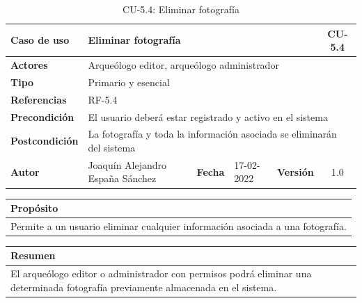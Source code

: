     \begin{table}[H]
    \begin{center}
        \begin{adjustbox}{width=\textwidth}
        \begin{tabular}{ | l | l | l | l | c | c | } 
            \hline
            \textbf{Caso de uso} & \multicolumn{4}{l|}{Eliminar fotografía} & \cellcolor{gray!50} \textbf{CU-5.4}\\
            \hline
            \textbf{Actores} & \multicolumn{5}{p{0.9\linewidth}|}{Arqueólogo editor, arqueólogo administrador} \\
            \hline
            \textbf{Tipo} & \multicolumn{5}{l|}{Primario y esencial} \\
            \hline
            \textbf{Referencias} & \multicolumn{3}{l|}{RF-5.4} & \multicolumn{2}{l|}{ }\\
            \hline
            \textbf{Precondición} & \multicolumn{5}{l|}{El usuario deberá estar registrado y activo en el sistema} \\
            \hline
            \textbf{Postcondición} & \multicolumn{5}{l|}{La fotografía y toda la información asociada se eliminarán del sistema} \\
            \hline
            \textbf{Autor} & \multicolumn{1}{p{0.25\linewidth}|}{Joaquín Alejandro España Sánchez} & \textbf{Fecha} & 
            17-02-2022     & \textbf{Versión}                                                      & 1.0\\
            \hline
        \end{tabular}
        \end{adjustbox}
        \caption{CU-5.4: Eliminar fotografía}
        \label{tab:delete-photo}
    \end{center}
    \end{table}

    \begin{table}[H]
        \centering
        \begin{tabularx}{\textwidth}{@{} |L |@{}} \hline
            \textbf{Propósito} \\
            \hline
            Permite a un usuario eliminar cualquier información asociada a una fotografía. \\
            \hline
        \end{tabularx}
    \end{table}

    \begin{table}[H]
        \centering
        \begin{tabularx}{\textwidth}{@{} |L |@{}} \hline
            \textbf{Resumen} \\
            \hline
            El arqueólogo editor o administrador con permisos podrá eliminar una determinada
            fotografía previamente almacenada en el sistema. \\
            \hline
        \end{tabularx}
    \end{table}


